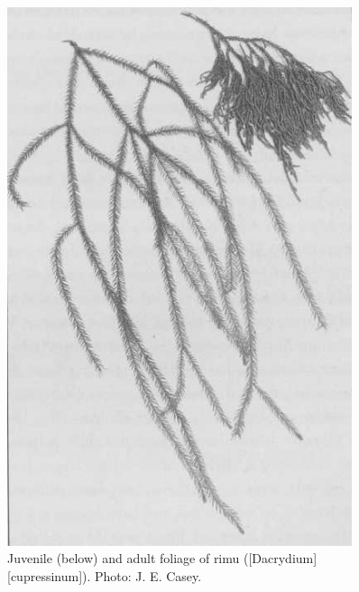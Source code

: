 \begin{figure}[htb]
	\centering
	\begin{minipage}[t]{0.493\textwidth}
		\centering
		\includegraphics[width=0.9\textwidth]{graphics/figure21rimu.jpg}
    	\caption[Rimu foliage]{Juvenile (below) and adult foliage of rimu ([Dacrydium][cupressinum]).
    	Photo: J. E. Casey.}%
    	\label{fig:21rimu}
	\end{minipage}\hfill%
	\begin{minipage}[t]{0.487\textwidth}
    	\centering

\end{minipage}
\end{figure}
